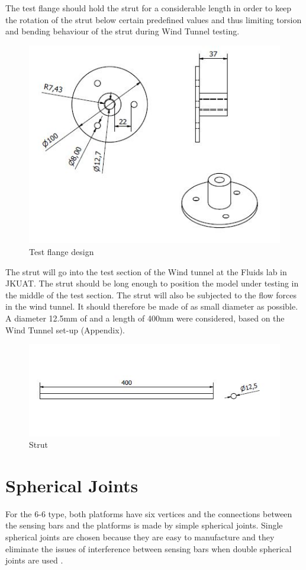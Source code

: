 The test flange should hold the strut for a considerable length in order to keep the rotation of the strut below certain predefined values and thus limiting torsion and bending behaviour of the strut during Wind Tunnel testing.
\begin{center}
	\begin{figure}[H]
	\centering
	\includegraphics[width=0.75\linewidth]{Figures/Test}
	\caption[Test flange]{Test flange design}
	\end{figure}
\end{center}
The strut will go into the test section of the Wind tunnel at the Fluids lab in JKUAT. The strut should be long enough to position the model under testing in the middle of the test section. The strut will also be subjected to the flow forces in the wind tunnel. It should therefore be made of as small diameter as possible. A diameter 12.5mm of and a length of 400mm were considered, based on the Wind Tunnel set-up (Appendix).
\begin{center}
	\begin{figure}[H]
	\centering
	\includegraphics[width=0.75\linewidth]{Figures/Strut}
	\caption[Strut]{Strut}
	\end{figure}
\end{center}

\section{Spherical Joints}
For the 6-6 type, both platforms have six vertices and
the connections between the sensing bars and the platforms is made by simple spherical joints. Single spherical joints are chosen because they are easy to manufacture and they eliminate the issues of interference between sensing bars when double spherical joints are used \cite{fernandes_design_nodate}. 

